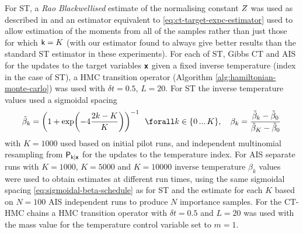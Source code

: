 For \ac{ST}, a \emph{Rao Blackwellised} estimate of the normalising constant $Z$ was used as described in \citep{carlson2016partition} and an estimator equivalent to \eqref{eq:ct-target-expc-estimator} used to allow estimation of the moments from all of the samples rather than just those for which $\mathsf{k}=K$ (with our estimator found to always give better results than the standard \ac{ST} estimator in these experiments). For each of \ac{ST}, Gibbs \ac{CT} and \ac{AIS} for the updates to the target variables $\boldsymbol{\mathsf{x}}$ given a fixed inverse temperature (index in the case of \ac{ST}), a \ac{HMC} transition operator (Algorithm \ref{alg:hamiltonian-monte-carlo}) was used with $\delta t = 0.5$, $L = 20$. For \ac{ST} the inverse temperature values used a sigmoidal spacing
\begin{equation}\label{eq:sigmoidal-beta-schedule}
  \tilde{\beta}_k = \lpa 1 + \exp\lpa -4\frac{2k-K}{K}\rpa\rpa^{-1} ~~\forall k \in \lbrace 0\,...\,K \rbrace, \quad
  \beta_k = \frac{\tilde{\beta}_k - \tilde{\beta}_0}{\tilde{\beta}_K - \tilde{\beta}_0}
\end{equation}
with $K=1000$ used based on initial pilot runs, and independent multinomial resampling from $\mathsf{P}_{\mathsf{k}|\boldsymbol{\mathsf{x}}}$ for the updates to the temperature index. For \ac{AIS} separate runs with $K=1000$, $K=5000$ and $K=10000$ inverse temperature $\beta_k$ values were used to obtain estimates at different run times, using the same sigmoidal spacing \eqref{eq:sigmoidal-beta-schedule} as for \ac{ST} and the estimate for each $K$ based on $N=100$ \ac{AIS} independent runs to produce $N$ importance samples. For the \ac{CT-HMC} chains a \ac{HMC} transition operator with $\delta t=0.5$ and $L=20$ was used with the mass value for the temperature control variable set to $m=1$.

